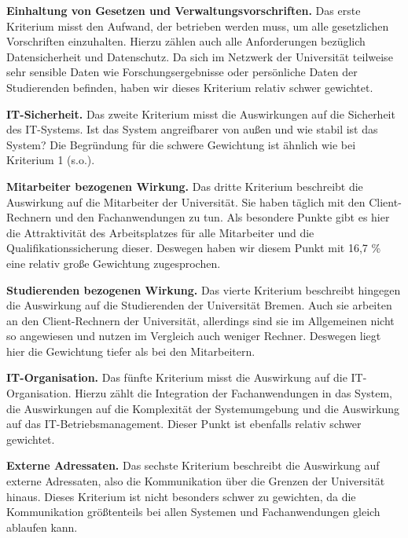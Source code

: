 \documentclass[12pt,utf8]{scrartcl}
\begin{document}
\newpage
\textbf{Einhaltung von Gesetzen und Verwaltungsvorschriften.} Das erste Kriterium misst den Aufwand, der betrieben werden muss, um alle gesetzlichen Vorschriften einzuhalten. Hierzu zählen auch alle Anforderungen bezüglich Datensicherheit und Datenschutz. Da sich im Netzwerk der Universität teilweise sehr sensible Daten wie Forschungsergebnisse oder persönliche Daten der Studierenden befinden, haben wir dieses Kriterium relativ schwer gewichtet.
\newline

\textbf{IT-Sicherheit.} Das zweite Kriterium misst die Auswirkungen auf die Sicherheit des IT-Systems. Ist das System angreifbarer von außen und wie stabil ist das System? Die Begründung für die schwere Gewichtung ist ähnlich wie bei Kriterium 1 (s.o.). 
\newline

\textbf{Mitarbeiter bezogenen Wirkung.} Das dritte Kriterium beschreibt die Auswirkung auf die Mitarbeiter der Universität. Sie haben täglich mit den Client-Rechnern und den Fachanwendungen zu tun. Als besondere Punkte gibt es hier die Attraktivität des Arbeitsplatzes für alle Mitarbeiter und die Qualifikationssicherung dieser. Deswegen haben wir diesem Punkt mit 16,7 \% eine relativ große Gewichtung zugesprochen. 
\newline

\textbf{Studierenden bezogenen Wirkung.} Das vierte Kriterium beschreibt hingegen die Auswirkung auf die Studierenden der Universität Bremen. Auch sie arbeiten an den Client-Rechnern der Universität, allerdings sind sie im Allgemeinen nicht so angewiesen und nutzen im Vergleich auch weniger Rechner. Deswegen liegt hier die Gewichtung tiefer als bei den Mitarbeitern. 
\newline

\textbf{IT-Organisation.} Das fünfte Kriterium misst die Auswirkung auf die IT-Organisation. Hierzu zählt die Integration der Fachanwendungen in das System, die Auswirkungen auf die Komplexität der Systemumgebung und die Auswirkung auf das IT-Betriebsmanagement. Dieser Punkt ist ebenfalls relativ schwer gewichtet.
\newline

\textbf{Externe Adressaten.} Das sechste Kriterium beschreibt die Auswirkung auf externe Adressaten, also die Kommunikation über die Grenzen der Universität hinaus. Dieses Kriterium ist nicht besonders schwer zu gewichten, da die Kommunikation größtenteils bei allen Systemen und Fachanwendungen gleich ablaufen kann. 
\newline
\end{document}

